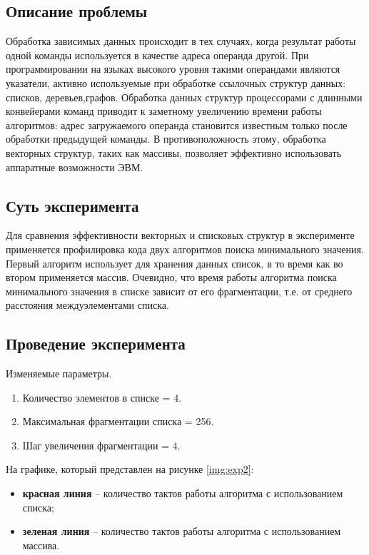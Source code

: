 \subsection{Описание проблемы}
Обработка зависимых данных происходит в тех случаях, когда результат работы одной команды используется в качестве адреса операнда другой. При программировании на языках высокого уровня такими операндами являются указатели, активно используемые при обработке ссылочных структур данных: списков, деревьев,графов. Обработка данных структур процессорами с длинными конвейерами команд приводит к заметному увеличению  времени работы алгоритмов: адрес загружаемого операнда   становится   известным   только   после   обработки   предыдущей   команды.   В противоположность этому, обработка векторных структур, таких как массивы, позволяет эффективно использовать аппаратные возможности ЭВМ.

\subsection{Суть эксперимента}  
Для сравнения эффективности векторных и списковых структур в эксперименте применяется профилировка кода двух алгоритмов поиска минимального значения. Первый алгоритм использует для хранения данных список, в то время как во втором применяется массив. Очевидно, что время работы алгоритма поиска минимального значения в списке зависит от его фрагментации, т.е. от среднего расстояния междуэлементами   списка. 


\subsection{Проведение эксперимента}

Изменяемые параметры.

\begin{enumerate}
	\item Количество элементов в списке = 4.
	\item Максимальная фрагментации списка = 256.
	\item Шаг увеличения фрагментации = 4.
\end{enumerate}

На графике, который представлен на рисунке \ref{img:exp2}:
\begin{itemize}
	\item \textbf{красная линия} -- количество тактов работы алгоритма с использованием списка;
	\item \textbf{зеленая линия} -- количество тактов работы алгоритма с использованием массива.
\end{itemize}

